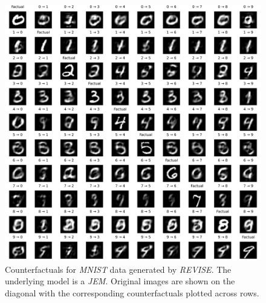 \begin{figure}
  \centering
  \includegraphics[width=1.0\linewidth]{../www/mnist_all_jem_revise.png}
  \caption{Counterfactuals for \textit{MNIST} data generated by \textit{REVISE}. The underlying model is a \textit{JEM}. Original images are shown on the diagonal with the corresponding counterfactuals plotted across rows.}\label{fig:mnist-revise-jem}
\end{figure}

